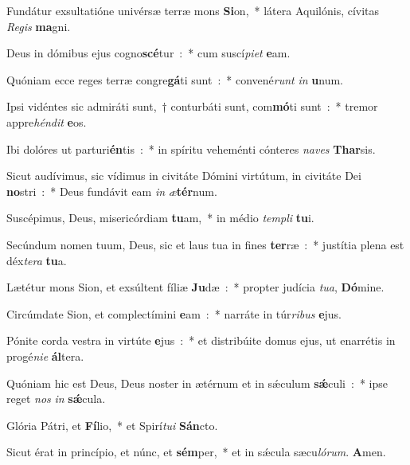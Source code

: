\item Fundátur exsultatióne univérsæ terræ mons \textbf{Si}on,~* látera Aquilónis, cívitas \emph{Re}\emph{gis} \textbf{ma}gni.
\item Deus in dómibus ejus cogno\textbf{scé}tur~:~* cum suscí\emph{pi}\emph{et} \textbf{e}am.
\item Quóniam ecce reges terræ congre\textbf{gá}ti sunt~:~* convené\emph{runt} \emph{in} \textbf{u}num.
\item Ipsi vidéntes sic admiráti sunt,~† conturbáti sunt, com\textbf{mó}ti sunt~:~* tremor appre\emph{hén}\emph{dit} \textbf{e}os.
\item Ibi dolóres ut parturi\textbf{én}tis~:~* in spíritu veheménti cónteres \emph{na}\emph{ves} \textbf{Thar}sis.
\item Sicut audívimus, sic vídimus in civitáte Dómini virtútum, in civitáte Dei \textbf{no}stri~:~* Deus fundávit eam \emph{in} \emph{æ}\textbf{tér}num.
\item Suscépimus, Deus, misericórdiam \textbf{tu}am,~* in médio \emph{tem}\emph{pli} \textbf{tu}i.
\item Secúndum nomen tuum, Deus, sic et laus tua in fines \textbf{ter}ræ~:~* justítia plena est déx\emph{te}\emph{ra} \textbf{tu}a.
\item Lætétur mons Sion, et exsúltent fíliæ \textbf{Ju}dæ~:~* propter judícia \emph{tu}\emph{a}, \textbf{Dó}mine.
\item Circúmdate Sion, et complectímini \textbf{e}am~:~* narráte in túr\emph{ri}\emph{bus} \textbf{e}jus.
\item Pónite corda vestra in virtúte \textbf{e}jus~:~* et distribúite domus ejus, ut enarrétis in progé\emph{ni}\emph{e} \textbf{ál}tera.
\item Quóniam hic est Deus, Deus noster in ætérnum et in sǽculum \textbf{sǽ}culi~:~* ipse reget \emph{nos} \emph{in} \textbf{sǽ}cula.
\item Glória Pátri, et \textbf{Fí}lio,~* et Spirí\emph{tu}\emph{i} \textbf{Sán}cto.
\item Sicut érat in princípio, et núnc, et \textbf{sém}per,~* et in sǽcula sæcu\emph{ló}\emph{rum}. \textbf{A}men.